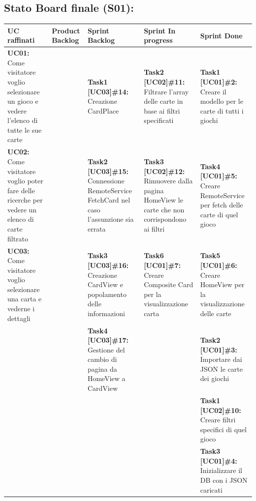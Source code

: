 \begin{landscape}
        \subsection{Stato Board finale (S01):}
        \small
        \def\arraystretch{2}%
        \begin{tabular}{ | p{5cm} | p{3cm} | p{5cm} | p{5cm} | p{5cm}| }
            \hline
            \textbf{UC raffinati}
            & \textbf{Product Backlog}
            & \textbf{Sprint Backlog}
            & \textbf{Sprint In progress}
            & \textbf{Sprint Done} \\
            \hline
            \textbf{UC01:} Come visitatore voglio selezionare un gioco e vedere l'elenco di tutte le sue carte
            & & \textbf{Task1 [UC03]\#14:} Creazione CardPlace
            & \textbf{Task2 [UC02]\#11:} Filtrare l'array delle carte in base ai filtri specificati
            & \textbf{Task1 [UC01]\#2:} Creare il modello per le carte di tutti i giochi \\
            \hline
            \textbf{UC02:} Come visitatore voglio poter fare delle ricerche per vedere un elenco di carte filtrato
            & & \textbf{Task2 [UC03]\#15:} Connessione RemoteService FetchCard nel caso l'assunzione sia errata
            & \textbf{Task3 [UC02]\#12:} Rimuovere dalla pagina HomeView le carte che non corrispondono ai filtri
            & \textbf{Task4 [UC01]\#5:} Creare RemoteService per fetch delle carte di quel gioco \\
            \hline
            \textbf{UC03:} Come visitatore voglio selezionare una carta e vederne i dettagli
            & & \textbf{Task3 [UC03]\#16:} Creazione CardView e popolamento delle informazioni
            & \textbf{Task6 [UC01]\#7:} Creare Composite Card per la visualizzazione carta
            & \textbf{Task5 [UC01]\#6:} Creare HomeView per la visualizzazione delle carte \\
            \hline
            & & \textbf{Task4 [UC03]\#17:} Gestione del cambio di pagina da HomeView a CardView
            & & \textbf{Task2 [UC01]\#3:} Importare dai JSON le carte dei giochi \\
            \hline
            & & & & \textbf{Task1 [UC02]\#10:} Creare filtri specifici di quel gioco  \\
            \hline
            & & & & \textbf{Task3 [UC01]\#4:} Inizializzare il DB con i JSON caricati \\
            \hline
        \end{tabular}
        \normalsize
        \newpage

\end{landscape}
